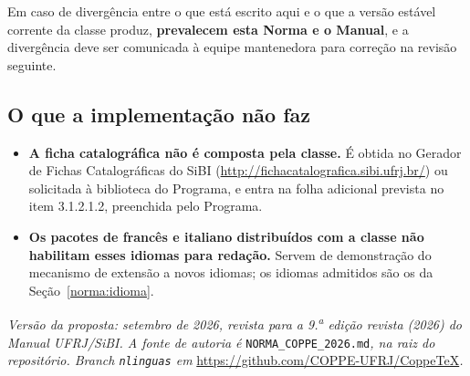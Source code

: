 \documentclass[a4paper,11pt]{article}
\begin{document}
Em caso de divergência entre o que está escrito aqui e o que a versão estável
corrente da classe produz, \textbf{prevalecem esta Norma e o Manual}, e a
divergência deve ser comunicada à equipe mantenedora para correção na revisão
seguinte.

\subsection{O que a implementação não faz}

\begin{itemize}[nosep]
  \item \textbf{A ficha catalográfica não é composta pela classe.} É obtida no
    Gerador de Fichas Catalográficas do SiBI
    (\url{http://fichacatalografica.sibi.ufrj.br/}) ou solicitada à biblioteca
    do Programa, e entra na folha adicional prevista no item 3.1.2.1.2,
    preenchida pelo Programa.
  \item \textbf{Os pacotes de francês e italiano distribuídos com a classe não
    habilitam esses idiomas para redação.} Servem de demonstração do mecanismo
    de extensão a novos idiomas; os idiomas admitidos são os da
    Seção~\ref{norma:idioma}.
\end{itemize}

\vspace{4mm}\hrulefill

\noindent\textit{Versão da proposta: setembro de 2026, revista para a
9.\textsuperscript{a} edição revista (2026) do Manual UFRJ/SiBI. A fonte de
autoria é} \texttt{NORMA\_COPPE\_2026.md}\textit{, na raiz do repositório.
\emph{Branch} \texttt{nlinguas} em}
\url{https://github.com/COPPE-UFRJ/CoppeTeX}\textit{.}
\end{document}
